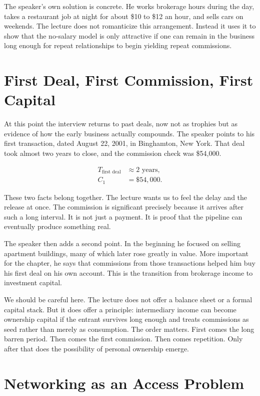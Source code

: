 The speaker's own solution is concrete. He works brokerage hours during the day, takes a restaurant job at night for about \$10 to \$12 an hour, and sells cars on weekends. The lecture does not romanticize this arrangement. Instead it uses it to show that the no-salary model is only attractive if one can remain in the business long enough for repeat relationships to begin yielding repeat commissions.

\section{First Deal, First Commission, First Capital}

At this point the interview returns to past deals, now not as trophies but as evidence of how the early business actually compounds. The speaker points to his first transaction, dated August 22, 2001, in Binghamton, New York. That deal took almost two years to close, and the commission check was \$54,000.

\begin{align}
T_{\text{first deal}} &\approx 2 \text{ years}, \\
C_1 &= \$54{,}000.
\end{align}

These two facts belong together. The lecture wants us to feel the delay and the release at once. The commission is significant precisely because it arrives after such a long interval. It is not just a payment. It is proof that the pipeline can eventually produce something real.

The speaker then adds a second point. In the beginning he focused on selling apartment buildings, many of which later rose greatly in value. More important for the chapter, he says that commissions from those transactions helped him buy his first deal on his own account. This is the transition from brokerage income to investment capital.

We should be careful here. The lecture does not offer a balance sheet or a formal capital stack. But it does offer a principle: intermediary income can become ownership capital if the entrant survives long enough and treats commissions as seed rather than merely as consumption. The order matters. First comes the long barren period. Then comes the first commission. Then comes repetition. Only after that does the possibility of personal ownership emerge.

\section{Networking as an Access Problem}

